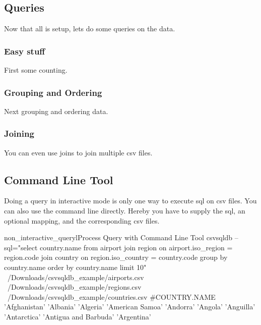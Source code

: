 \subsection{Queries}
Now that all is setup, lets do some queries on the data.

\subsubsection{Easy stuff}
First some counting.


\subsubsection{Grouping and Ordering}
Next grouping and ordering data.


\subsubsection{Joining}
You can even use joins to join multiple csv files.


\subsection{Command Line Tool}

Doing a query in interactive mode is only one way to execute sql on csv files. You can also use the command line directly. Hereby you have to supply the sql, an optional mapping, and the corresponding csv files.

\begin{ShellListing}{non_interactive_queryl}{Process Query with Command Line Tool}
csvsqldb --sql="select country.name from airport join region on airport.iso_region = region.code join country on region.iso_country = country.code group by country.name order by country.name limit 10" ~/Downloads/csvsqldb_example/airports.csv ~/Downloads/csvsqldb_example/regions.csv ~/Downloads/csvsqldb_example/countries.csv
#COUNTRY.NAME
'Afghanistan'
'Albania'
'Algeria'
'American Samoa'
'Andorra'
'Angola'
'Anguilla'
'Antarctica'
'Antigua and Barbuda'
'Argentina'
\end{ShellListing}

